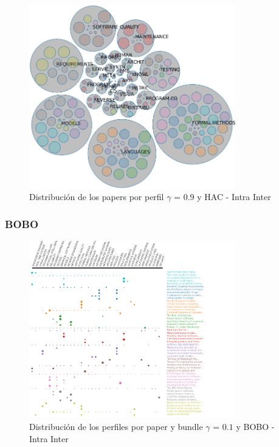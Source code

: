 \begin{figure}[H]
  \centering
    \includegraphics[width=0.8\textwidth]{resultados/papers/HAC/INTRA_INTER/bubbles-gamma-09.png}
  \caption{Distribución de los papers por perfil $\gamma$ = $0.9$ y HAC - Intra Inter}
  \label{res:img-papers-bubbles-gamma09-hac-intra-inter}
\end{figure}

\subsubsection{BOBO}
\begin{figure}[H]
  \centering
    \includegraphics[width=0.8\textwidth]{resultados/papers/BOBO/INTRA_INTER/gamma-01.png}
  \caption{Distribución de los perfiles por paper y bundle $\gamma$ = $0.1$ y BOBO - Intra Inter}
  \label{res:img-papers-gamma01-bobo-intra-inter}
\end{figure}

